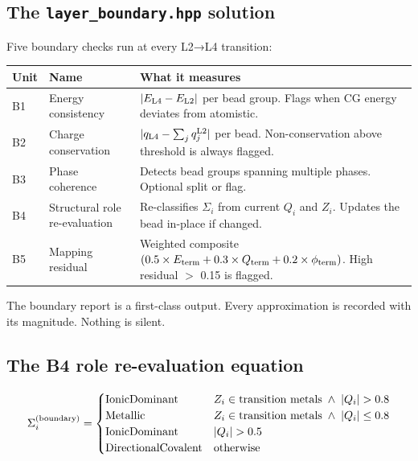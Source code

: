 \documentclass[11pt, a4paper, oneside]{article}
\theoremstyle{definition}
\newcommand{\file}[1]{\texttt{#1}}
\begin{document}
\subsection{The \file{layer\_boundary.hpp} solution}

Five boundary checks run at every L2→L4 transition:

\begin{center}
\begin{tabular}{llp{7cm}}
\toprule
Unit & Name & What it measures \\
\midrule
B1 & Energy consistency &
  $|E_{\rm L4} - E_{\rm L2}|$ per bead group.
  Flags when CG energy deviates from atomistic. \\
B2 & Charge conservation &
  $|q_{\rm L4} - \sum_j q_j^{\rm L2}|$ per bead.
  Non-conservation above threshold is always flagged. \\
B3 & Phase coherence &
  Detects bead groups spanning multiple phases.
  Optional split or flag. \\
B4 & Structural role re-evaluation &
  Re-classifies $\Sigma_i$ from current $Q_i$ and $Z_i$.
  Updates the bead in-place if changed. \\
B5 & Mapping residual &
  Weighted composite $(0.5 \times E_{\rm term}
    + 0.3 \times Q_{\rm term}
    + 0.2 \times \phi_{\rm term})$.
  High residual $>$ 0.15 is flagged. \\
\bottomrule
\end{tabular}
\end{center}

The boundary report is a first-class output.  Every approximation is
recorded with its magnitude.  Nothing is silent.

\subsection{The B4 role re-evaluation equation}

\begin{equation}
  \Sigma_i^{(\rm boundary)} =
  \begin{cases}
    \text{IonicDominant} & Z_i \in \text{transition metals}
                           \;\wedge\; |Q_i| > 0.8 \\
    \text{Metallic}      & Z_i \in \text{transition metals}
                           \;\wedge\; |Q_i| \leq 0.8 \\
    \text{IonicDominant} & |Q_i| > 0.5 \\
    \text{DirectionalCovalent} & \text{otherwise}
  \end{cases}
  \label{eq:b4-role}
\end{equation}
\end{document}
